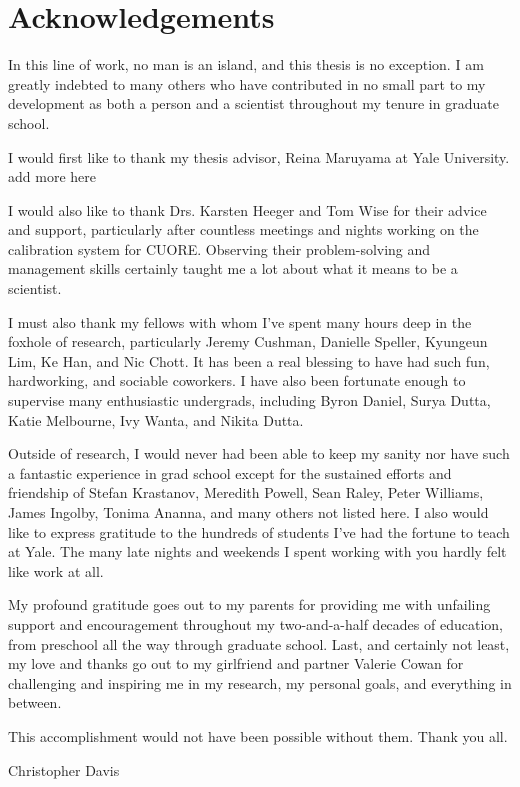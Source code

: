 \chapter*{Acknowledgements}
In this line of work, no man is an island, and this thesis is no exception.
I am greatly indebted to many others who have contributed in no small part to my development as both a person and a scientist throughout my tenure in graduate school.

I would first like to thank my thesis advisor, Reina Maruyama at Yale University. \color{red}add more here \color{black}

I would also like to thank Drs. Karsten Heeger and Tom Wise for their advice and support, particularly after countless meetings and nights working on the calibration system for CUORE.
Observing their problem-solving and management skills certainly taught me a lot about what it means to be a scientist.

I must also thank my fellows with whom I've spent many hours deep in the foxhole of research, particularly Jeremy Cushman, Danielle Speller, Kyungeun Lim, Ke Han, and Nic Chott. It has been a real blessing to have had such fun, hardworking, and sociable coworkers.
I have also been fortunate enough to supervise many enthusiastic undergrads, including Byron Daniel, Surya Dutta, Katie Melbourne, Ivy Wanta, and Nikita Dutta.

Outside of research, I would never had been able to keep my sanity nor have such a fantastic experience in grad school except for the sustained efforts and friendship of Stefan Krastanov, Meredith Powell, Sean Raley, Peter Williams, James Ingolby, Tonima Ananna, and many others not listed here.
I also would like to express gratitude to the hundreds of students I've had the fortune to teach at Yale.
The many late nights and weekends I spent working with you hardly felt like work at all.

My profound gratitude goes out to my parents for providing me with unfailing support and encouragement throughout my two-and-a-half decades of education, from preschool all the way through graduate school.
Last, and certainly not least, my love and thanks go out to my girlfriend and partner Valerie Cowan for challenging and inspiring me in my research, my personal goals, and everything in between.

This accomplishment would not have been possible without them. Thank you all.

Christopher Davis

